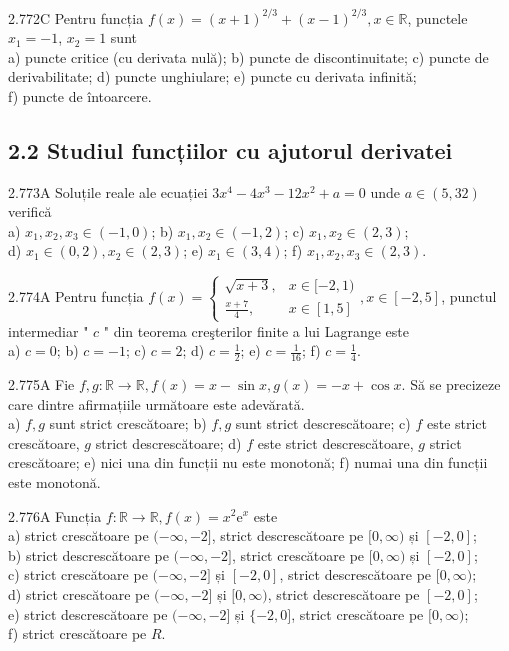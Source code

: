 \documentclass[11pt]{article}
\begin{document}
2.772C Pentru funcția $f(x)=(x+1)^{2 / 3}+(x-1)^{2 / 3}, x \in \mathbb{R}$, punctele $x_{1}=-1$, $x_{2}=1$ sunt\\ a) puncte critice (cu derivata nulă); b) puncte de discontinuitate; c) puncte de derivabilitate; d) puncte unghiulare; e) puncte cu derivata infinită;\\ f) puncte de întoarcere.

\subsection*{2.2 Studiul funcțiilor cu ajutorul derivatei}
2.773A Soluțile reale ale ecuației $3 x^{4}-4 x^{3}-12 x^{2}+a=0$ unde $a \in(5,32)$ verifică\\ a) $x_{1}, x_{2}, x_{3} \in(-1,0)$; b) $x_{1}, x_{2} \in(-1,2)$; c) $x_{1}, x_{2} \in(2,3)$;\\ d) $x_{1} \in(0,2), x_{2} \in(2,3)$; e) $x_{1} \in(3,4)$; f) $x_{1}, x_{2}, x_{3} \in(2,3)$.

2.774A Pentru funcția $f(x)=\left\{\begin{array}{ll}\sqrt{x+3}, & x \in[-2,1) \\ \frac{x+7}{4}, & x \in[1,5]\end{array}, x \in[-2,5]\right.$, punctul intermediar " $c$ " din teorema creşterilor finite a lui Lagrange este\\ a) $c=0$; b) $c=-1$; c) $c=2$; d) $c=\frac{1}{2}$; e) $c=\frac{1}{16}$; f) $c=\frac{1}{4}$.

2.775A Fie $f, g: \mathbb{R} \rightarrow \mathbb{R}, f(x)=x-\sin x, g(x)=-x+\cos x$. Să se precizeze care dintre afirmațiile următoare este adevărată.\\ a) $f, g$ sunt strict crescătoare; b) $f, g$ sunt strict descrescătoare; c) $f$ este strict crescătoare, $g$ strict descrescătoare; d) $f$ este strict descrescătoare, $g$ strict crescătoare; e) nici una din funcții nu este monotonă; f) numai una din funcții este monotonă.

2.776A Funcția $f: \mathbb{R} \rightarrow \mathbb{R}, f(x)=x^{2} \mathrm{e}^{x}$ este\\ a) strict crescătoare pe $(-\infty,-2]$, strict descrescătoare pe $[0, \infty)$ și $[-2,0]$;\\ b) strict descrescătoare pe $(-\infty,-2]$, strict crescătoare pe $[0, \infty)$ și $[-2,0]$;\\ c) strict crescătoare pe $(-\infty,-2]$ și $[-2,0]$, strict descrescătoare pe $[0, \infty)$;\\ d) strict crescătoare pe $(-\infty,-2]$ și $[0, \infty)$, strict descrescătoare pe $[-2,0]$;\\ e) strict descrescătoare pe $(-\infty,-2]$ și $\{-2,0]$, strict crescătoare pe $[0, \infty)$;\\ f) strict crescătoare pe $R$.
\end{document}

